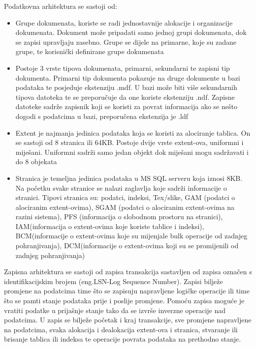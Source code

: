 \documentclass[12pt, oneside, onecolumn]{book}
\begin{document}
{Podatkovna arhitektura se sastoji od:

\begin{itemize}
\item Grupe dokumenata, koriste se radi jednostavnije alokacije i organizacije dokumenata. Dokument može pripadati samo jednoj grupi dokumenata, dok se zapisi upravljaju zasebno. Grupe se dijele na primarne, koje su zadane grupe, te korisnički definirane grupe dokumenata
\item Postoje 3 vrste tipova dokumenata, primarni, sekundarni te zapisni tip dokumenta. Primarni tip dokumenta pokazuje na druge dokumente u bazi podataka te posjeduje ekstenziju .mdf. U bazi može biti više sekundarnih tipova datoteka te se preporučuje da one koriste ekstenziju .ndf. Zapisne datoteke sadrže zapisnik koji se koristi za povrat informacija ako se nešto dogodi s podatcima u bazi, preporučena ekstenzija je .ldf
\item Extent je najmanja jedinica podataka koja se koristi za alociranje tablica. On se sastoji od 8 stranica ili 64KB. Postoje dvije vrste extent-ova, uniformni i miješani. Uniformni sadrži samo jedan objekt dok miješani mogu sadržavati i do 8 objekata
\item Stranica je temeljna jedinica podataka u MS SQL serveru koja iznosi 8KB. Na početku svake stranice se nalazi zaglavlja koje sadrži informacije o stranici. Tipovi stranica su: podatci, indeksi, Tex/slike, GAM (podatci o alociranim extent-ovima), SGAM (podatci o alociranim extent-ovima na razini sistema), PFS (informacija o slobodnom prostoru na stranici), IAM(informacija o extent-ovima koje koriste tablice i indeksi), BCM(informacije o extent-ovima koje su mijenjale bulk operacije od zadnjeg pohranjivanja), DCM(informacije o extent-ovima koji su se promijenili od zadnjeg pohranjivanja) 
\end{itemize}

Zapisna arhitektura se sastoji od zapisa transakcija sastavljen od zapisa označen s identifikacijskim brojem (eng.LSN-Log Sequence Number). Zapisi bilježe promjene na podatcima time što se zapisuju napravljene logičke operacije ili time što se pamti stanje podataka prije i poslije promjene. Pomoću zapisa moguće je vratiti podatke u prijašnje stanje tako da se izvrše inverzne operacije nad podatcima. U zapis se bilježe početak i kraj transakcije, sve promjene napravljene na podatcima, svaka alokacija i dealokacija extent-ova i stranica, stvaranje ili brisanje tablica ili indeksa te operacije povrata podataka na prethodno stanje. 

}
\end{document}
